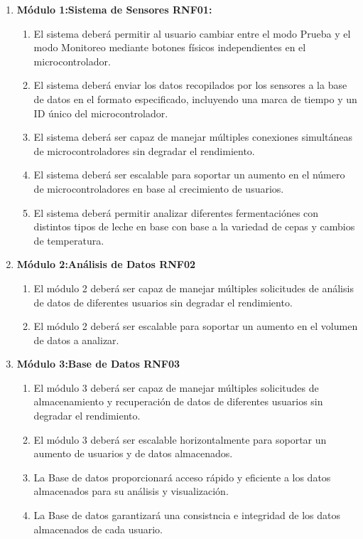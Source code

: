     \begin{enumerate}
    \item \label{it:RNF01} \textbf{Módulo 1:Sistema de Sensores RNF01:}
                \begin{enumerate}
                    \item El sistema deberá permitir al usuario cambiar entre el modo Prueba y el modo Monitoreo mediante botones físicos independientes en el microcontrolador.
                        \item El sistema deberá enviar los datos recopilados por los sensores a la base de datos en el formato especificado, incluyendo una marca de tiempo y un ID único del microcontrolador.
                        \item El sistema deberá ser capaz de manejar múltiples conexiones simultáneas de microcontroladores sin degradar el rendimiento.
                        \item El sistema deberá ser escalable para soportar un aumento en el número de microcontroladores en base al crecimiento de usuarios.
                        \item El sistema deberá permitir analizar diferentes fermentaciónes con distintos tipos de leche en base con base a la variedad de cepas y cambios de temperatura.
                \end{enumerate}

    \item \textbf{Módulo 2:Análisis de Datos RNF02}\label{it:RNF02}
                    \begin{enumerate}
                            \item El módulo 2 deberá ser capaz de manejar múltiples solicitudes de análisis de datos de diferentes usuarios sin degradar el rendimiento.
                            \item El módulo 2 deberá ser escalable para soportar un aumento en el volumen de datos a analizar.
                    \end{enumerate}


    \item \label{it:RNF03} \textbf{Módulo 3:Base de Datos RNF03}
                \begin{enumerate}
                        \item El módulo 3 deberá ser capaz de manejar múltiples solicitudes de almacenamiento y recuperación de datos de diferentes usuarios sin degradar el rendimiento.
                        \item El módulo 3 deberá ser escalable horizontalmente para soportar un aumento de usuarios y de datos almacenados.
                        \item La Base de datos proporcionará acceso rápido y eficiente a los datos almacenados para su análisis y visualización.
                        \item La Base de datos garantizará una consistncia e integridad de los datos almacenados de cada usuario. 
                \end{enumerate}


\end{enumerate}
